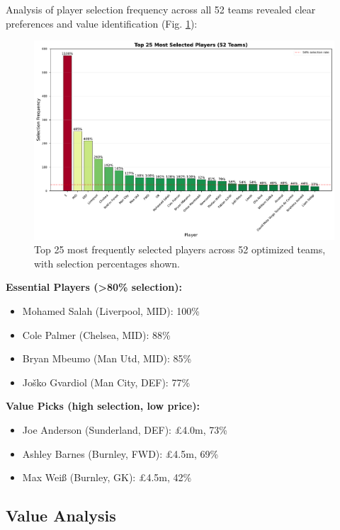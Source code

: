 \documentclass[10pt,a4paper,twocolumn]{article}
\begin{document}
Analysis of player selection frequency across all 52 teams revealed clear preferences and value identification (Fig. \ref{fig:selection_frequency}):

\begin{figure}[h]
\centering
\includegraphics[width=\columnwidth]{figures/player_selection_frequency.pdf}
\caption{Top 25 most frequently selected players across 52 optimized teams, with selection percentages shown.}
\label{fig:selection_frequency}
\end{figure}

\textbf{Essential Players (>80\% selection):}
\begin{itemize}
\item Mohamed Salah (Liverpool, MID): 100\%
\item Cole Palmer (Chelsea, MID): 88\%
\item Bryan Mbeumo (Man Utd, MID): 85\%
\item Joško Gvardiol (Man City, DEF): 77\%
\end{itemize}

\textbf{Value Picks (high selection, low price):}
\begin{itemize}
\item Joe Anderson (Sunderland, DEF): £4.0m, 73\%
\item Ashley Barnes (Burnley, FWD): £4.5m, 69\%
\item Max Weiß (Burnley, GK): £4.5m, 42\%
\end{itemize}

\subsection*{Value Analysis}
\end{document}
